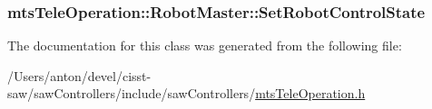 \subsubsection[{Set\+Robot\+Control\+State}]{ mts\+Tele\+Operation\+::\+Robot\+Master\+::\+Set\+Robot\+Control\+State}\label{classmts_tele_operation_1_1_robot_master_a11e283aec6cec91955b9fc132b6f4bc8}


The documentation for this class was generated from the following file\+:\begin{DoxyCompactItemize}
\item 
/\+Users/anton/devel/cisst-\/saw/saw\+Controllers/include/saw\+Controllers/\hyperlink{mts_tele_operation_8h}{mts\+Tele\+Operation.\+h}\end{DoxyCompactItemize}
